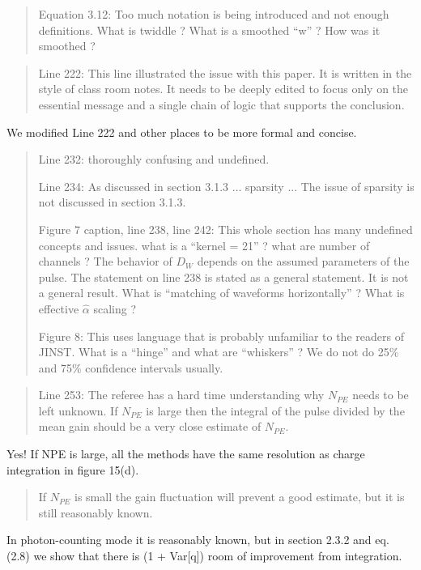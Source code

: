 \documentclass[12pt]{article}
\begin{document}
\begin{quote}
Equation 3.12: Too much notation is being introduced and not enough definitions. What is twiddle ? What is a smoothed ``w'' ? How was it smoothed ?
\end{quote}

\begin{quote}
Line 222: This line illustrated the issue with this paper. It is written in the style of class room notes. It needs to be deeply edited to focus only on the essential message and a single chain of logic that supports the conclusion.
\end{quote}

We modified Line 222 and other places to be more formal and concise.

\begin{quote}
Line 232: thoroughly confusing and undefined.

Line 234: As discussed in section 3.1.3 ... sparsity ... The issue of sparsity is not discussed in section 3.1.3.

Figure 7 caption, line 238, line 242: This whole section has many undefined concepts and issues. what is a ``kernel = 21'' ? what are number of channels ? The behavior of $D_W$ depends on the assumed parameters of the pulse. The statement on line 238 is stated as a general statement. It is not a general result. What is ``matching of waveforms horizontally'' ? What is effective $\hat{\alpha}$ scaling ?

Figure 8: This uses language that is probably unfamiliar to the readers of JINST. What is a ``hinge'' and what are ``whiskers'' ? We do not do 25\% and 75\% confidence intervals usually.
\end{quote}

\begin{quote}
Line 253: The referee has a hard time understanding why $N_{PE}$ needs to be left unknown. If $N_{PE}$ is large then the integral of the pulse divided by the mean gain should be a very close estimate of $N_{PE}$. 
\end{quote}

Yes! If NPE is large, all the methods have the same resolution as charge integration in figure 15(d).

\begin{quote}
If $N_{PE}$ is small the gain fluctuation will prevent a good estimate, but it is still reasonably known.
\end{quote}

In photon-counting mode it is reasonably known, but in section 2.3.2 and eq. (2.8) we show that there is (1 + Var[q]) room of improvement from integration.
\end{document}
